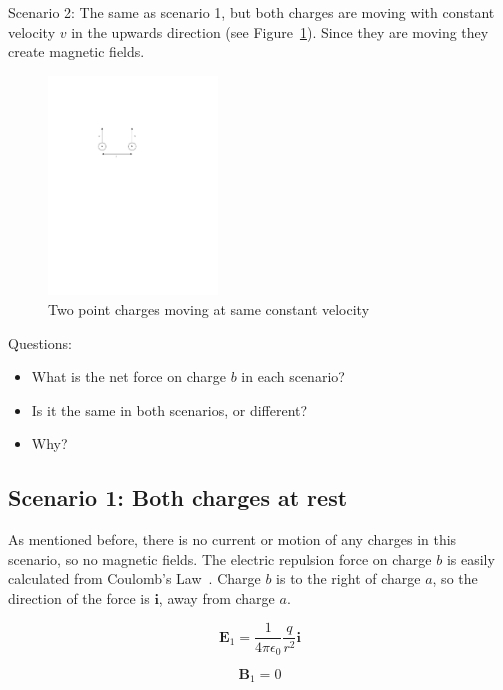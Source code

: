 \documentclass[a4paper]{article}
\theoremstyle{plain}
\theoremstyle{definition}
\newcommand{\ihat}{\mathbf{i}}
\newcommand{\vect}[1]{\mathbf{#1}}
\begin{document}
Scenario 2: The same as scenario 1, but both charges are moving with
constant velocity $v$ in the upwards direction (see
Figure~\ref{fig:two-charges-moving}).  Since they are moving they
create magnetic fields.

\begin{figure}[ht]
	\centering
	\includegraphics[width=0.4\textwidth]{two-charges-moving-cropped.pdf}
	\caption{Two point charges moving at same constant velocity}
	\label{fig:two-charges-moving}
\end{figure}

Questions:
\begin{itemize}
  \item What is the net force on charge $b$ in each scenario?
  \item Is it the same in both scenarios, or different?
  \item Why?
\end{itemize}


\subsection{Scenario 1: Both charges at rest}

As mentioned before, there is no current or motion of any charges in
this scenario, so no magnetic fields.  The electric repulsion force on
charge $b$ is easily calculated from Coulomb's Law~\cite{CoulombsLaw}.
Charge $b$ is to the right of charge $a$, so the direction of the force is
$\ihat$, away from charge $a$.

\begin{equation}
\vect{E}_1 = \frac{1}{4 \pi \epsilon_0} \frac{q}{r^2} \ihat \label{eq:E1}
\end{equation}

\begin{equation}
\vect{B}_1 = 0
\end{equation}
\end{document}
